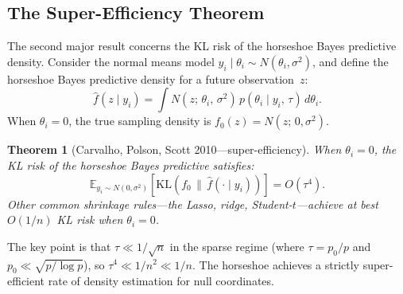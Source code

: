 \documentclass[12pt]{article}
\newtheorem{theorem}{Theorem}[section]
\newcommand{\E}{\mathbb{E}}
\newcommand{\KL}{\mathrm{KL}}
\begin{document}
\subsection{The Super-Efficiency Theorem}\label{sec:super-eff}

The second major result concerns the KL risk of the horseshoe Bayes predictive density. Consider the normal means model $y_i \mid \theta_i \sim N(\theta_i, \sigma^2)$, and define the horseshoe Bayes predictive density for a future observation~$z$:
\begin{equation}\label{eq:predictive}
  \hat{f}(z \mid y_i) = \int N(z;\, \theta_i,\, \sigma^2)\, p(\theta_i \mid y_i,\, \tau)\, d\theta_i.
\end{equation}
When $\theta_i = 0$, the true sampling density is $f_0(z) = N(z;\, 0, \sigma^2)$.

\begin{theorem}[Carvalho, Polson, Scott 2010---super-efficiency]\label{thm:super-eff}
When $\theta_i = 0$, the KL risk of the horseshoe Bayes predictive satisfies:
\begin{equation}\label{eq:super-eff}
  \E_{y_i \sim N(0,\sigma^2)}\!\left[\KL\!\left(f_0 \,\big\|\, \hat{f}(\cdot \mid y_i)\right)\right] = O(\tau^4).
\end{equation}
Other common shrinkage rules---the Lasso, ridge, Student-$t$---achieve at best $O(1/n)$ KL risk when $\theta_i = 0$.
\end{theorem}

The key point is that $\tau \ll 1/\sqrt{n}$ in the sparse regime (where $\tau = p_0/p$ and $p_0 \ll \sqrt{p/\log p}$), so $\tau^4 \ll 1/n^2 \ll 1/n$. The horseshoe achieves a strictly super-efficient rate of density estimation for null coordinates.
\end{document}
